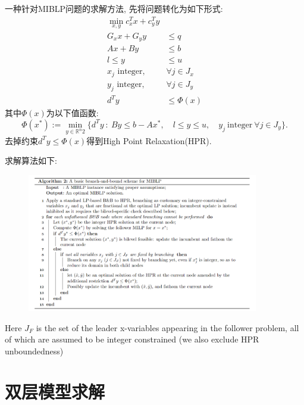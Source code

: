 \documentclass{article}
\begin{document}
一种针对MIBLP问题的求解方法, 先将问题转化为如下形式:
\begin{align*}
    \operatorname*{min}_{x,y}c_{x}^{T}x+c_{y}^{T}y \\
    G_{x}x+G_{y}y& \leq q  \\
    Ax+By&\leq b \\
    l\leq y& \leq u  \\
    x_j\text{ integer},&\forall j\in J_x\\
    y_{j}\text{ integer},&\forall j\in J_{y} \\
    d^{T}y&\leq\Phi(x)
\end{align*}
其中$\Phi(x)$为以下值函数:
$$
\Phi(x^*):=\min_{y\in\mathbb{R}^n2}\{d^Ty~:~By\leq b-Ax^*,\quad l\leq y\leq u,\quad y_j\mathrm{~integer~}\forall j\in J_y\}.
$$
去掉约束$d^Ty\leq\Phi(x)$得到High Point Relaxation(HPR).

求解算法如下:
\begin{figure}[H]
    \centering
    \includegraphics[width=0.9\textwidth]{./pic/MIBLP_algo.png}
    \label{fig:MIBLP}
\end{figure}
Here $J_F$ is the set of the leader x-variables appearing in the follower problem, all of 
which are assumed to be integer constrained (we also exclude HPR unboundedness)

\clearpage
\setcounter{section}{0}

\section{双层模型求解}
\end{document}

